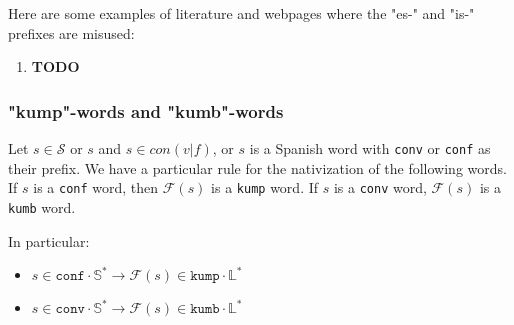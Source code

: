 \begin{example}
    Here are some examples of literature and webpages where the "es-" and "is-"
    prefixes are misused:
\end{example}

\begin{enumerate}
    \item \textbf{TODO}
\end{enumerate}

\subsubsection{"kump"-words and "kumb"-words}

Let \(s \in \mathcal{S}\) or \(s\) and \(s \in con(v|f)\), or \(s\) is a Spanish
word with \texttt{conv} or \texttt{conf} as their prefix. We have a particular rule
for the nativization of the following words. If \(s\) is a \texttt{conf} word, then
\(\mathcal{F}(s)\) is a \texttt{kump} word. If \(s\) is a \texttt{conv} word,
\(\mathcal{F}(s)\) is a \texttt{kumb} word.

In particular:
\begin{itemize}
    \item \(s \in \texttt{conf}\cdot \mathbb{S}^* \rightarrow \mathcal{F}(s) \in \texttt{kump}\cdot \mathbb{L}^*\)
    \item \(s \in \texttt{conv}\cdot \mathbb{S}^* \rightarrow \mathcal{F}(s) \in \texttt{kumb}\cdot \mathbb{L}^*\)
\end{itemize}

